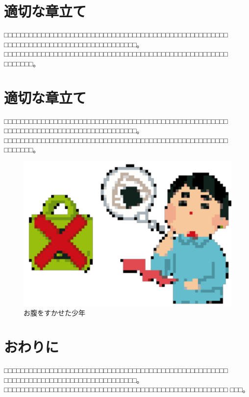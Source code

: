 \documentclass[a4paper,9pt,twocolumn,dvipdfmx]{jarticle}
\begin{document}
\section{適切な章立て}
□□□□□□□□□□□□□□□□□□□□□□□□□□□□□□□□□□□□□□□□□□□□□□□□□□□□□□
□□□□□□□□□□□□□□□□□□□□□□□□□□□□□□□□。
□□□□□□□□□□□□□□□□□□□□□□□□□□□□□□□□□□□□□□□□□□□□□□□□□□□□□□
□□□□□□□。

\section{適切な章立て}
□□□□□□□□□□□□□□□□□□□□□□□□□□□□□□□□□□□□□□□□□□□□□□□□□□□□□□
□□□□□□□□□□□□□□□□□□□□□□□□□□□□□□□□。
□□□□□□□□□□□□□□□□□□□□□□□□□□□□□□□□□□□□□□□□□□□□□□□□□□□□□□
□□□□□□□。

\begin{figure}
\centering
\includegraphics{image/hungry.pdf}
\caption{お腹をすかせた少年}
\label{fig:whole}
\end{figure}

\section{おわりに}
□□□□□□□□□□□□□□□□□□□□□□□□□□□□□□□□□□□□□□□□□□□□□□□□□□□□□□
□□□□□□□□□□□□□□□□□□□□□□□□□□□□□□□□。
□□□□□□□□□□□□□□□□□□□□□□□□□□□□□□□□□□□□□□□□□□□□□□□□□□□□□□
□□□\cite{Sou}。


\end{document}
